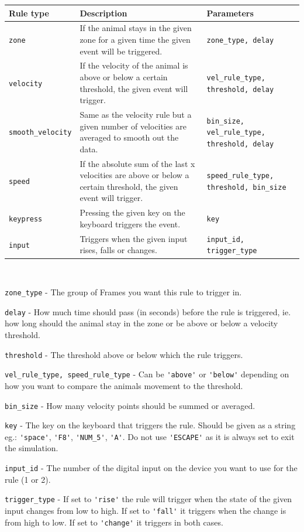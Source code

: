 \documentclass[11pt,a4paper]{article}
\newcommand{\param}[1]{\item \texttt{#1} -}
\begin{document}
\begin{tabularx}{\textwidth}{|p{3.1cm}|X|p{4cm}|}
\hline 
\rule[-1ex]{0pt}{2.5ex} 
Rule type & Description & Parameters \\ 

\hline 
\rule[-1ex]{0pt}{2.5ex} 
\texttt{zone} & If the animal stays in the given zone for a given time the given event will be triggered. & \texttt{zone\_type, delay} \\ 

\hline 
\rule[-1ex]{0pt}{2.5ex} 
\texttt{velocity} & If the velocity of the animal is above or below a certain threshold, the given event will trigger. & \texttt{vel\_rule\_type, threshold, delay} \\ 

\hline 
\rule[-1ex]{0pt}{2.5ex} 
\texttt{smooth\_velocity} & Same as the velocity rule but a given number of velocities are averaged to smooth out the data. & \texttt{bin\_size, vel\_rule\_type, threshold, delay} \\ 

\hline 
\rule[-1ex]{0pt}{2.5ex} 
\texttt{speed} & If the absolute sum of the last x velocities are above or below a certain threshold, the given event will trigger. & \texttt{speed\_rule\_type, threshold, bin\_size} \\ 


\hline 
\rule[-1ex]{0pt}{2.5ex} 
\texttt{keypress} & Pressing the given key on the keyboard triggers the event. & \texttt{key} \\ 

\hline 
\rule[-1ex]{0pt}{2.5ex} 
\texttt{input} & Triggers when the given input rises, falls or changes. & \texttt{input\_id, trigger\_type} \\ 

\hline 
\end{tabularx}
\\

\begin{paramlist}
\param{zone\_type} The group of Frames you want this rule to trigger in.
\param{delay} How much time should pass (in seconds) before the rule is triggered, ie. how long should the animal stay in the zone or be above or below a velocity threshold.
\param{threshold} The threshold above or below which the rule triggers.
\param{vel\_rule\_type, speed\_rule\_type} Can be \lstinline{'above'} or \lstinline{'below'} depending on how you want to compare the animals movement to the threshold.
\param{bin\_size} How many velocity points should be summed or averaged.
\param{key} The key on the keyboard that triggers the rule. Should be given as a string eg.: \lstinline{'space'}, \lstinline{'F8'}, \lstinline{'NUM_5'}, \lstinline{'A'}. Do not use \lstinline{'ESCAPE'} as it is always set to exit the simulation.
\param{input\_id} The number of the digital input on the device you want to use for the rule (1 or 2).
\param{trigger\_type} If set to \lstinline{'rise'} the rule will trigger when the state of the given input changes from low to high. If set to \lstinline{'fall'} it triggers when the change is from high to low. If set to \lstinline{'change'} it triggers in both cases. 
\end{paramlist}
\end{document}
